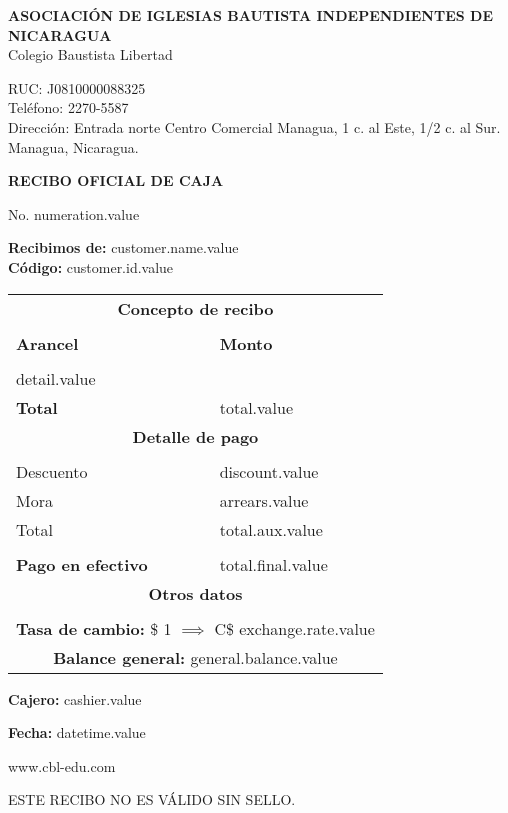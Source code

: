 \documentclass[11pt]{article}
\newcommand{\thenumber}{numeration.value}
\newcommand{\customerName}{customer.name.value}
\newcommand{\customerId}{customer.id.value}
\newcommand{\detail}{detail.value}
\newcommand{\total}{total.value}
\newcommand{\discountTotal}{discount.value}
\newcommand{\arrearsTotal}{arrears.value}
\newcommand{\auxTotal}{total.aux.value}
\newcommand{\finalTotal}{total.final.value}
\newcommand{\cashier}{cashier.value}
\newcommand{\datetime}{datetime.value}
\newcommand{\exchangeRate}{exchange.rate.value}
\newcommand{\generalBalance}{general.balance.value}
\begin{document}
    \begin{center}
        \textbf{ASOCIACIÓN DE IGLESIAS BAUTISTA INDEPENDIENTES DE NICARAGUA}\\Colegio Baustista Libertad\par
        {
            \small
            RUC: J0810000088325\\
            Teléfono: 2270-5587\\
            Dirección: Entrada norte Centro Comercial Managua, 1 c. al Este, 1/2 c. al Sur. Managua, Nicaragua.\par
        }
        \textbf{RECIBO OFICIAL DE CAJA}\par
        No. \thenumber
    \end{center}
    \textbf{Recibimos de:} \customerName\\
    \textbf{Código:} \customerId

    \begin{longtable}{p{3.8cm} p{1.8cm}}
        \hline
        \multicolumn{2}{c}{\textbf{Concepto de recibo}} \\\\
        \textbf{Arancel} & \textbf{Monto} \\\\
        \detail\\
        \textbf{Total} & \total\\
        \hline
        \multicolumn{2}{c}{\textbf{Detalle de pago}} \\\\
        Descuento & \discountTotal\\
        Mora & \arrearsTotal\\
        Total & \auxTotal\\\\
        \textbf{Pago en efectivo} & \finalTotal\\
        \hline
        \multicolumn{2}{c}{\textbf{Otros datos}}\\\\
        \multicolumn{2}{c}{\textbf{Tasa de cambio:} \$ 1 $\implies$ C\$ \exchangeRate}\\
        \multicolumn{2}{c}{\textbf{Balance general:} \generalBalance}
    \end{longtable}
    
    \textbf{Cajero:} \cashier\par
    \textbf{Fecha:} \datetime
    \begin{center}
        www.cbl-edu.com\par
        ESTE RECIBO NO ES VÁLIDO SIN SELLO.
    \end{center}
\end{document}
